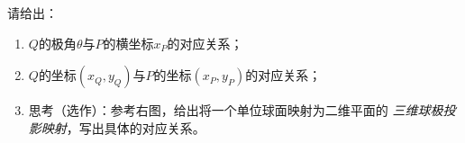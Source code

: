 \begin{ext}
\begin{enumerate}
	  请给出：
	  \begin{enumerate}[(1)]
	    \item $Q$的极角$\theta$与$P$的横坐标$x_P$的对应关系；
	    \item $Q$的坐标$(x_Q,y_Q)$与$P$的坐标$(x_P,y_P)$的对应关系；
	    \item 思考（选作）：参考右图，给出将一个单位球面映射为二维平面的
	    {\it 三维球极投影映射}，写出具体的对应关系。
	  \end{enumerate}
	\begin{center}
		\quad
		

\end{center}
\end{enumerate}
\end{ext}
